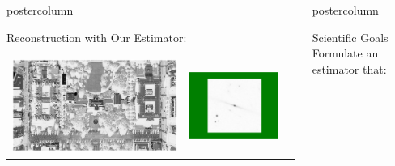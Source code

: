 \documentclass[final]{beamer}
\newlength{\columnheight}
\begin{document}
\begin{frame}
\begin{columns}
\begin{column}{.32\textwidth}
\begin{beamercolorbox}[center,wd=\textwidth]{postercolumn}
\begin{minipage}[T]{.95\textwidth}
{\begin{block}{Reconstruction with Our Estimator:}
\begin{table}
\begin{tabular}{ccc}
\begin{minipage}[c][2.5in][c]{6in}
                  \includegraphics[width = 5in,trim=80 130 80 90,clip]{./figures/satelliteEstimator4.eps} 
                  \end{minipage} &
                  \begin{minipage}[c][2.5in][c]{5in}
                  \includegraphics[width=2.7in,trim = 120 40 105 40,clip]{./figures/astroEstimator4green.eps} 
                  \end{minipage}
                \end{tabular}
              \end{table}
            \end{block}
          \vfill
          }
        \end{minipage}
      \end{beamercolorbox}
    \end{column}
  \begin{column}{.32\textwidth}
    \begin{beamercolorbox}[center,wd=\textwidth]{postercolumn}
      \begin{minipage}[T]{.95\textwidth} 
        \parbox[t][\columnheight]{\textwidth}{
          \vfill
            \begin{alertblock}{Scientific Goals}
              Formulate an estimator that:

\end{alertblock}}
\end{minipage}
\end{beamercolorbox}
\end{column}
\end{columns}
\end{frame}
\end{document}
